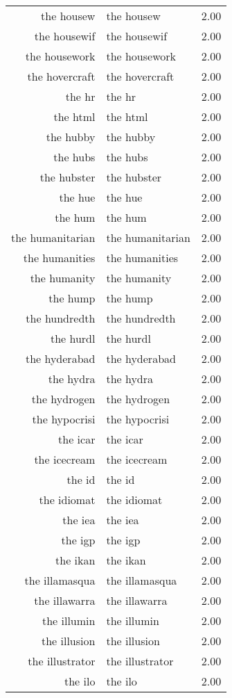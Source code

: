 \begin{table}[ht]
\begin{tabular}{rlr}
  the housew & the housew & 2.00 \\ 
  the housewif & the housewif & 2.00 \\ 
  the housework & the housework & 2.00 \\ 
  the hovercraft & the hovercraft & 2.00 \\ 
  the hr & the hr & 2.00 \\ 
  the html & the html & 2.00 \\ 
  the hubby & the hubby & 2.00 \\ 
  the hubs & the hubs & 2.00 \\ 
  the hubster & the hubster & 2.00 \\ 
  the hue & the hue & 2.00 \\ 
  the hum & the hum & 2.00 \\ 
  the humanitarian & the humanitarian & 2.00 \\ 
  the humanities & the humanities & 2.00 \\ 
  the humanity & the humanity & 2.00 \\ 
  the hump & the hump & 2.00 \\ 
  the hundredth & the hundredth & 2.00 \\ 
  the hurdl & the hurdl & 2.00 \\ 
  the hyderabad & the hyderabad & 2.00 \\ 
  the hydra & the hydra & 2.00 \\ 
  the hydrogen & the hydrogen & 2.00 \\ 
  the hypocrisi & the hypocrisi & 2.00 \\ 
  the icar & the icar & 2.00 \\ 
  the icecream & the icecream & 2.00 \\ 
  the id & the id & 2.00 \\ 
  the idiomat & the idiomat & 2.00 \\ 
  the iea & the iea & 2.00 \\ 
  the igp & the igp & 2.00 \\ 
  the ikan & the ikan & 2.00 \\ 
  the illamasqua & the illamasqua & 2.00 \\ 
  the illawarra & the illawarra & 2.00 \\ 
  the illumin & the illumin & 2.00 \\ 
  the illusion & the illusion & 2.00 \\ 
  the illustrator & the illustrator & 2.00 \\ 
  the ilo & the ilo & 2.00 \\ 

\end{tabular}
\end{table}
